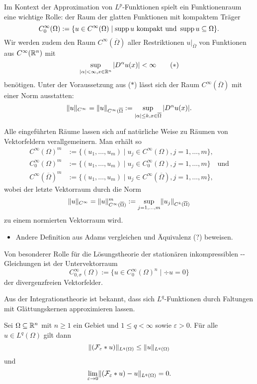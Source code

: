Im Kontext der Approximation von $L^p$-Funktionen spielt ein Funktionenraum eine wichtige Rolle: der Raum der glatten Funktionen mit kompaktem Träger
$$
C_0^\infty(\Omega) := \{ u \in C^\infty(\Omega) \mid \operatorname{supp} u \text{ kompakt und } \operatorname{supp} u \subseteq \Omega\}.
$$
Wir werden zudem den Raum $C^\infty(\overline\Omega)$ aller Restriktionen $u|_{\overline\Omega}$ von Funktionen aus $C^\infty(\mathbb{R}^n)$ mit
\begin{displaymath}
  \sup_{|\alpha| < \infty, x \in \mathbb{R}^n} |D^\alpha u(x)| < \infty \tag{$\ast$}
\end{displaymath}
benötigen.
Unter der Voraussetzung aus ($\ast$) lässt sich der Raum $C^\infty(\overline\Omega)$ mit einer Norm ausstatten:
$$
\lVert u \rVert_{C^\infty} = \lVert u \rVert_{C^\infty(\overline\Omega} := \sup_{|\alpha|\leq k, x \in \overline\Omega} |D^\alpha u(x)|.
$$

Alle eingeführten Räume lassen sich auf natürliche Weise zu Räumen von Vektorfeldern verallgemeinern.
Man erhält so
\begin{align*}
  C^\infty(\Omega)^m &:= \{(u_1,\dots,u_m) \mid u_j \in C^\infty(\Omega), j = 1,\dots,m\}, \\
  C_0^\infty(\Omega)^m &:= \{(u_1,\dots,u_m) \mid u_j \in C_0^\infty(\Omega), j = 1,\dots,m\} \quad\text{und} \\
  C^\infty(\overline\Omega)^m &:= \{(u_1,\dots,u_m) \mid u_j \in C^\infty(\overline\Omega), j = 1,\dots,m\},
\end{align*}
wobei der letzte Vektorraum durch die Norm
$$
\lVert u \rVert_{C^\infty} = \lVert u \rVert_{C^\infty(\overline\Omega)}^m := \sup_{j = 1,\dots, m} \lVert u_j \rVert_{C^k(\overline\Omega)}
$$
zu einem normierten Vektorraum wird.

\begin{itemize}
  \item Andere Definition aus Adams vergleichen und Äquivalenz (?) beweisen.
\end{itemize}

Von besonderer Rolle für die Lösungstheorie der stationären inkompressiblen \navier\hyp{}\stokes\hyp{}Gleichungen ist der Untervektorraum
$$
C_{0,\sigma}^\infty(\Omega) := \{u \in C_0^\infty(\Omega)^n \mid \div u = 0\}
$$
der divergenzfreien Vektorfelder.

Aus der Integrationstheorie ist bekannt, dass sich $L^q$-Funktionen durch Faltungen mit Glättungskernen approximieren lassen.

\begin{lem}
  Sei $\Omega \subseteq \mathbb{R}^n$ mit $n \geq 1$ ein Gebiet und $1 \leq q < \infty$ sowie $\varepsilon > 0$.
  Für alle $u \in L^q(\Omega)$ gilt dann
  $$
  \lVert (\mathcal{F}_\varepsilon \ast u) \rVert_{L^q(\Omega)} \leq  \lVert u \rVert_{L^q(\Omega)}
  $$
  und
  \begin{displaymath}
    \lim_{\varepsilon \to 0} \lVert (\mathcal{F}_\varepsilon \ast u) - u \rVert_{L^q(\Omega)} = 0. 
  \end{displaymath}
\end{lem}

